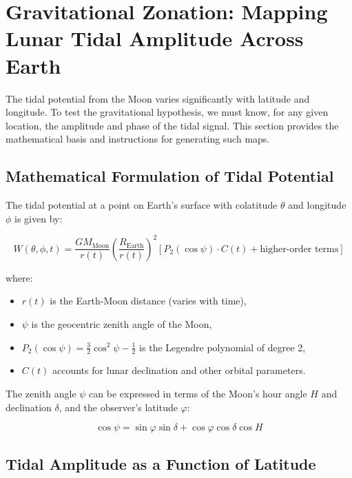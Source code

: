 \documentclass[12pt,a4paper]{article}
\theoremstyle{remark}
\begin{document}
	\section{Gravitational Zonation: Mapping Lunar Tidal Amplitude Across Earth}
	\label{sec:map}
	
	The tidal potential from the Moon varies significantly with latitude and longitude. To test the gravitational hypothesis, we must know, for any given location, the amplitude and phase of the tidal signal. This section provides the mathematical basis and instructions for generating such maps.
	
	\subsection{Mathematical Formulation of Tidal Potential}
	
	The tidal potential at a point on Earth's surface with colatitude $\theta$ and longitude $\phi$ is given by:
	
	\begin{equation}
		W(\theta, \phi, t) = \frac{GM_{\text{Moon}}}{r(t)} \left(\frac{R_{\text{Earth}}}{r(t)}\right)^2 \left[ P_2(\cos\psi) \cdot C(t) + \text{higher-order terms} \right]
		\label{eq:tidal-full-map}
	\end{equation}
	
	where:
	\begin{itemize}
		\item $r(t)$ is the Earth-Moon distance (varies with time),
		\item $\psi$ is the geocentric zenith angle of the Moon,
		\item $P_2(\cos\psi) = \frac{3}{2}\cos^2\psi - \frac{1}{2}$ is the Legendre polynomial of degree 2,
		\item $C(t)$ accounts for lunar declination and other orbital parameters.
	\end{itemize}
	
	The zenith angle $\psi$ can be expressed in terms of the Moon's hour angle $H$ and declination $\delta$, and the observer's latitude $\varphi$:
	
	\begin{equation}
		\cos\psi = \sin\varphi \sin\delta + \cos\varphi \cos\delta \cos H
		\label{eq:zenith}
	\end{equation}
	
	\subsection{Tidal Amplitude as a Function of Latitude}
	
\end{document}
